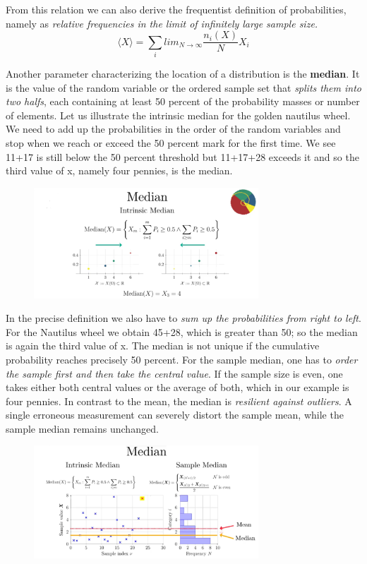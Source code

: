\documentclass[12pt, a4paper]{scrartcl}
\begin{document}
From this relation we can also derive the frequentist definition of probabilities, namely as \textit{relative frequencies in the limit of infinitely large sample size.}\\
\begin{equation*}\boxed{\langle X \rangle = \sum_i lim_{N\rightarrow \infty} \frac{n_i(X)}{N}X_i}\end{equation*}


Another parameter characterizing the location of a distribution is the \textbf{median}. It is the value of the random variable or the ordered sample set that \textit{splits them into two halfs}, each containing at least 50 percent of the probability masses or number of elements.
Let us illustrate the intrinsic median for the golden nautilus wheel. We need to add up the probabilities in the order of the random variables and stop when we reach or exceed the 50 percent mark for the first time. We see 11+17 is still below the 50 percent threshold but 11+17+28 exceeds it and so the third value of x, namely four pennies, is the median.
\begin{figure}[H]
	\centering
	\includegraphics[width=0.75\textwidth]{2_6.png}
\end{figure}
In the precise definition we also have to \textit{sum up the probabilities from right to left}. For the Nautilus wheel we obtain 45+28, which is greater than 50; so the median is again the third value of x. The median is not unique if the cumulative probability reaches precisely 50 percent.
For the sample median, one has to \textit{order the sample first and then take the central value}. If the sample size is even, one takes either both central values or the average of both, which in our example is four pennies.
In contrast to the mean, the median is \textit{resilient against outliers}. A single erroneous measurement can severely distort the sample mean, while the sample median remains unchanged.\\
\begin{figure}[H]
	\centering
	\includegraphics[width=0.75\textwidth]{2_7.png}
\end{figure}
\end{document}
